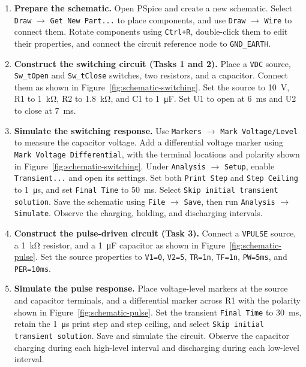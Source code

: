 \documentclass[12pt,a4paper]{article}
\begin{document}
	\begin{enumerate}[label=\arabic*., leftmargin=2.5em, itemsep=6pt]
		\item \textbf{Prepare the schematic.}
		Open PSpice and create a new schematic.  Select
		\texttt{Draw} $\rightarrow$ \texttt{Get New Part...} to place
		components, and use \texttt{Draw} $\rightarrow$ \texttt{Wire}
		to connect them.  Rotate components using \texttt{Ctrl+R},
		double-click them to edit their properties, and connect the
		circuit reference node to \texttt{GND\_EARTH}.
		
		\item \textbf{Construct the switching circuit (Tasks 1 and 2).}
		Place a \texttt{VDC} source, \texttt{Sw\_tOpen} and
		\texttt{Sw\_tClose} switches, two resistors, and a capacitor.
		Connect them as shown in Figure~\ref{fig:schematic-switching}.
		Set the source to \SI{10}{\volt}, R1 to \SI{1}{\kilo\ohm},
		R2 to \SI{1.8}{\kilo\ohm}, and C1 to
		\SI{1}{\micro\farad}.  Set U1 to open at
		\SI{6}{\milli\second} and U2 to close at
		\SI{7}{\milli\second}.
		
		\item \textbf{Simulate the switching response.}
		Use \texttt{Markers} $\rightarrow$ \texttt{Mark Voltage/Level}
		to measure the capacitor voltage.  Add a differential voltage
		marker using \texttt{Mark Voltage Differential}, with the
		terminal locations and polarity shown in
		Figure~\ref{fig:schematic-switching}.  Under
		\texttt{Analysis} $\rightarrow$ \texttt{Setup}, enable
		\texttt{Transient...} and open its settings.  Set both
		\texttt{Print Step} and \texttt{Step Ceiling} to
		\SI{1}{\micro\second}, and set \texttt{Final Time} to
		\SI{50}{\milli\second}.  Select
		\texttt{Skip initial transient solution}.  Save the schematic
		using \texttt{File} $\rightarrow$ \texttt{Save}, then run
		\texttt{Analysis} $\rightarrow$ \texttt{Simulate}.
		Observe the charging, holding, and discharging intervals.
		
		\item \textbf{Construct the pulse-driven circuit (Task 3).}
		Connect a \texttt{VPULSE} source, a \SI{1}{\kilo\ohm}
		resistor, and a \SI{1}{\micro\farad} capacitor as shown in
		Figure~\ref{fig:schematic-pulse}.  Set the source properties to
		\texttt{V1=0}, \texttt{V2=5}, \texttt{TR=1n},
		\texttt{TF=1n}, \texttt{PW=5ms}, and \texttt{PER=10ms}.
		
		\item \textbf{Simulate the pulse response.}
		Place voltage-level markers at the source and capacitor
		terminals, and a differential marker across R1 with the
		polarity shown in Figure~\ref{fig:schematic-pulse}.
		Set the transient \texttt{Final Time} to
		\SI{30}{\milli\second}, retain the \SI{1}{\micro\second}
		print step and step ceiling, and select
		\texttt{Skip initial transient solution}.  Save and simulate
		the circuit.  Observe the capacitor charging during each
		high-level interval and discharging during each low-level
		interval.
		

\end{enumerate}
\end{document}
